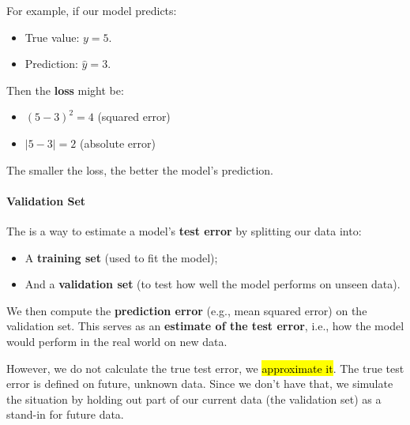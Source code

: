\begin{itemize}
    For example, if our model predicts:
    \begin{itemize}
        \item True value: $y = 5$.
        \item Prediction: $\hat{y} = 3$.
    \end{itemize}
    Then the \textbf{loss} might be:
    \begin{itemize}
        \item $\left(5-3\right)^{2} = 4$ (squared error)
        \item $\left|5-3\right| = 2$ (absolute error)
    \end{itemize}
    The smaller the loss, the better the model's prediction.
\end{itemize}

\newpage

\paragraph{Validation Set}

The  is a way to estimate a model's \textbf{test error} by splitting our data into:
\begin{itemize}
    \item A \textbf{training set} (used to fit the model);
    \item And a \textbf{validation set} (to test how well the model performs on unseen data).
\end{itemize}
We then compute the \textbf{prediction error} (e.g., mean squared error) on the validation set. This serves as an \textbf{estimate of the test error}, i.e., how the model would perform in the real world on new data.

\highspace
However, we do not calculate the true test error, we \hl{approximate it}. The true test error is defined on future, unknown data. Since we don't have that, we simulate the situation by holding out part of our current data (the validation set) as a stand-in for future data.

